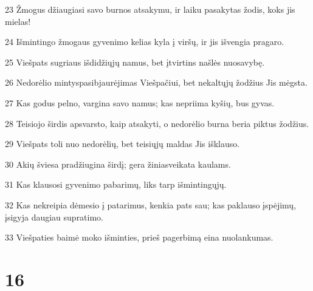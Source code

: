 \par 23 Žmogus džiaugiasi savo burnos atsakymu, ir laiku pasakytas žodis, koks jis mielas! 
\par 24 Išmintingo žmogaus gyvenimo kelias kyla į viršų, ir jis išvengia pragaro. 
\par 25 Viešpats sugriaus išdidžiųjų namus, bet įtvirtins našlės nuosavybę. 
\par 26 Nedorėlio mintys­pasibjaurėjimas Viešpačiui, bet nekaltųjų žodžius Jis mėgsta. 
\par 27 Kas godus pelno, vargina savo namus; kas nepriima kyšių, bus gyvas. 
\par 28 Teisiojo širdis apsvarsto, kaip atsakyti, o nedorėlio burna beria piktus žodžius. 
\par 29 Viešpats toli nuo nedorėlių, bet teisiųjų maldas Jis išklauso. 
\par 30 Akių šviesa pradžiugina širdį; gera žinia­sveikata kaulams. 
\par 31 Kas klausosi gyvenimo pabarimų, liks tarp išmintingųjų. 
\par 32 Kas nekreipia dėmesio į patarimus, kenkia pats sau; kas paklauso įspėjimų, įsigyja daugiau supratimo. 
\par 33 Viešpaties baimė moko išminties, prieš pagerbimą eina nuolankumas.



\chapter{16}


